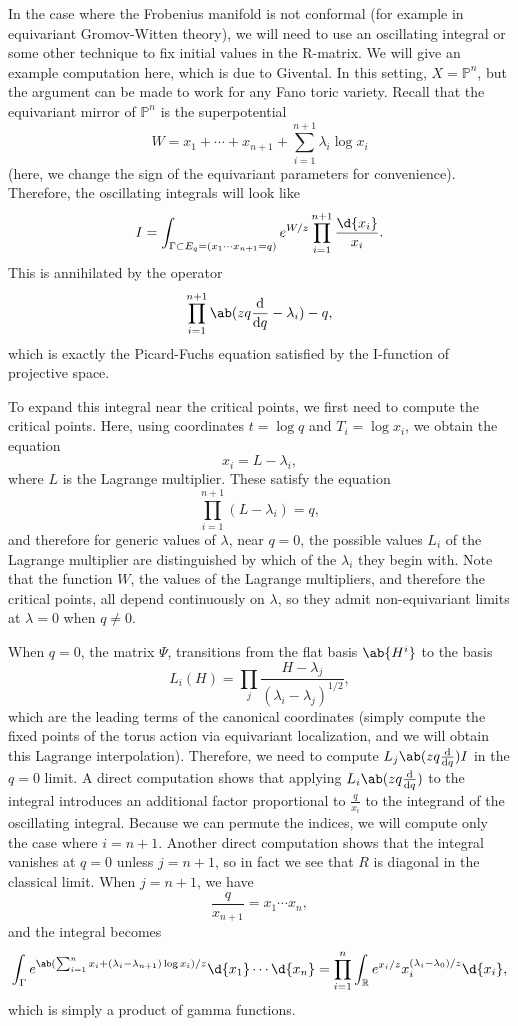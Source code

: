 \documentclass{amsart}
\theoremstyle{definition}
\theoremstyle{remark}
\theoremstyle{plain}
\theoremstyle{definition}
\theoremstyle{remark}
\newcommand{\R}{\mathbb{R}}
\renewcommand{\P}{\mathbb{P}}
\newcommand{\1}{\mathbf{1}}
\newcommand{\2}{\mathbf{2}}
\newcommand{\3}{\mathbf{3}}
\begin{document}
In the case where the Frobenius manifold is not conformal (for example in equivariant Gromov-Witten theory), we will need to use an oscillating integral or some other technique to fix initial values in the R-matrix. We will give an example computation here, which is due to Givental. In this setting, \(X = \P^n\), but the argument can be made to work for any Fano toric variety. Recall that the equivariant mirror of \(\P^n\) is the superpotential
\[ W = x_1 + \cdots + x_{n+1} + \sum_{i=1}^{n+1} \lambda_i \log x_i \]
(here, we change the sign of the equivariant parameters for convenience). Therefore, the oscillating integrals will look like
\[ I = \int_{\Gamma \subset E_q = (x_1 \cdots x_{n+1}=q)} e^{W/z} \prod_{i=1}^{n+1} \frac{\d{x_i}}{x_i}. \]
This is annihilated by the operator 
\[ \prod_{i=1}^{n+1}\ab(zq \odv{}{q} -\lambda_i) - q, \]
which is exactly the Picard-Fuchs equation satisfied by the I-function of projective space.

To expand this integral near the critical points, we first need to compute the critical points. Here, using coordinates \(t = \log q\) and \(T_i = \log x_i\), we obtain the equation
\[ x_i = L - \lambda_i, \]
where \(L\) is the Lagrange multiplier. These satisfy the equation
\[ \prod_{i=1}^{n+1} (L - \lambda_i) = q, \]
and therefore for generic values of \(\lambda\), near \(q = 0\), the possible values \(L_i\) of the Lagrange multiplier are distinguished by which of the \(\lambda_i\) they begin with. Note that the function \(W\), the values of the Lagrange multipliers, and therefore the critical points, all depend continuously on \(\lambda\), so they admit non-equivariant limits at \(\lambda = 0\) when \(q \neq 0\).

When \(q = 0\), the matrix \(\Psi\), transitions from the flat basis \(\ab{H^i}\) to the basis
\[ L_i(H) = \prod_j \frac{H - \lambda_j}{(\lambda_i - \lambda_j)^{1/2}}, \]
which are the leading terms of the canonical coordinates (simply compute the fixed points of the torus action via equivariant localization, and we will obtain this Lagrange interpolation). Therefore, we need to compute \(L_j \ab(z q \odv{}{q}) I\) in the \(q = 0\) limit. A direct computation shows that applying \(L_i \ab(z q \odv{}{q})\) to the integral introduces an additional factor proportional to \(\frac{q}{x_i}\) to the integrand of the oscillating integral. Because we can permute the indices, we will compute only the case where \(i = n+1\). Another direct computation shows that the integral vanishes at \(q = 0\) unless \( j = n+1\), so in fact we see that \(R\) is diagonal in the classical limit. When \(j = n+1\), we have
\[ \frac{q}{x_{n+1}} = x_1 \cdots x_n, \]
and the integral becomes
\[ \int_{\Gamma} e^{\ab( \sum_{i=1}^n x_i + (\lambda_i - \lambda_{n+1})\log x_i ) / z} \d{x_1} \cdots \d{x_n} = \prod_{i=1}^n \int_{\R} e^{x_i/z} x_i^{(\lambda_i - \lambda_0)/z} \d{x_i}, \]
which is simply a product of gamma functions.
\end{document}
